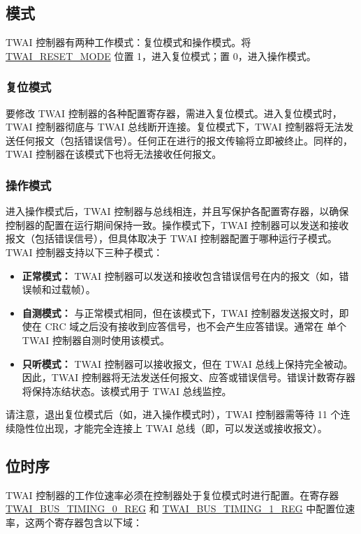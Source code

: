 \documentclass[main\_\_CN.tex]{subfiles}
\begin{document}
\subsection{模式}
\label{sec:twai-modes}
\chipname{} TWAI 控制器有两种工作模式：复位模式和操作模式。将 \hyperref[fielddesc:TWAIRESETMODE]{TWAI\_RESET\_MODE} 位置 1，进入复位模式；置 0，进入操作模式。

\subsubsection{复位模式}
要修改 TWAI 控制器的各种配置寄存器，需进入复位模式。进入复位模式时，TWAI 控制器彻底与 TWAI 总线断开连接。复位模式下，TWAI 控制器将无法发送任何报文（包括错误信号）。任何正在进行的报文传输将立即被终止。同样的，TWAI 控制器在该模式下也将无法接收任何报文。

\subsubsection{操作模式}
进入操作模式后，TWAI 控制器与总线相连，并且写保护各配置寄存器，以确保控制器的配置在运行期间保持一致。操作模式下，TWAI 控制器可以发送和接收报文（包括错误信号），但具体取决于 TWAI 控制器配置于哪种运行子模式。TWAI 控制器支持以下三种子模式：

\begin{itemize}
    \item {\bfseries 正常模式：} TWAI 控制器可以发送和接收包含错误信号在内的报文（如，错误帧和过载帧）。
    \item {\bfseries 自测模式：} 与正常模式相同，但在该模式下，TWAI 控制器发送报文时，即使在 CRC 域之后没有接收到应答信号，也不会产生应答错误。通常在 单个 TWAI 控制器自测时使用该模式。
    \item {\bfseries 只听模式：} TWAI 控制器可以接收报文，但在 TWAI 总线上保持完全被动。因此，TWAI 控制器将无法发送任何报文、应答或错误信号。错误计数寄存器将保持冻结状态。该模式用于 TWAI 总线监控。
\end{itemize}

请注意，退出复位模式后（如，进入操作模式时），TWAI 控制器需等待 11 个连续隐性位出现，才能完全连接上 TWAI 总线（即，可以发送或接收报文）。

\subsection{位时序}
TWAI 控制器的工作位速率必须在控制器处于复位模式时进行配置。在寄存器 \\\hyperref[regdesc:TWAIBUSTIMING0REG]{TWAI\_BUS\_TIMING\_0\_REG} 和 \hyperref[regdesc:TWAIBUSTIMING1REG]{TWAI\_BUS\_TIMING\_1\_REG} 中配置位速率，这两个寄存器包含以下域：
\end{document}
